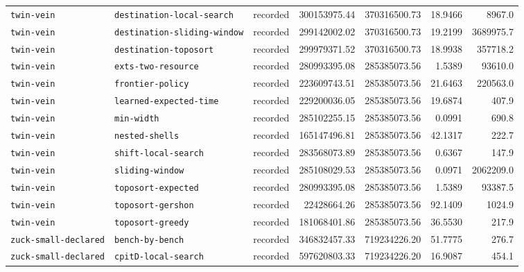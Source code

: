 \begin{longtable}{>{\raggedright\arraybackslash}p{}>{\raggedright\arraybackslash}p{}r r r r r}
\texttt{twin\allowbreak-vein} & \texttt{destination\allowbreak-local\allowbreak-search} & recorded & 300153975.44 & 370316500.73 & 18.9466 & 8967.0 \\
\texttt{twin\allowbreak-vein} & \texttt{destination\allowbreak-sliding\allowbreak-window} & recorded & 299142002.02 & 370316500.73 & 19.2199 & 3689975.7 \\
\texttt{twin\allowbreak-vein} & \texttt{destination\allowbreak-toposort} & recorded & 299979371.52 & 370316500.73 & 18.9938 & 357718.2 \\
\texttt{twin\allowbreak-vein} & \texttt{exts\allowbreak-two\allowbreak-resource} & recorded & 280993395.08 & 285385073.56 & 1.5389 & 93610.0 \\
\texttt{twin\allowbreak-vein} & \texttt{frontier\allowbreak-policy} & recorded & 223609743.51 & 285385073.56 & 21.6463 & 220563.0 \\
\texttt{twin\allowbreak-vein} & \texttt{learned\allowbreak-expected\allowbreak-time} & recorded & 229200036.05 & 285385073.56 & 19.6874 & 407.9 \\
\texttt{twin\allowbreak-vein} & \texttt{min\allowbreak-width} & recorded & 285102255.15 & 285385073.56 & 0.0991 & 690.8 \\
\texttt{twin\allowbreak-vein} & \texttt{nested\allowbreak-shells} & recorded & 165147496.81 & 285385073.56 & 42.1317 & 222.7 \\
\texttt{twin\allowbreak-vein} & \texttt{shift\allowbreak-local\allowbreak-search} & recorded & 283568073.89 & 285385073.56 & 0.6367 & 147.9 \\
\texttt{twin\allowbreak-vein} & \texttt{sliding\allowbreak-window} & recorded & 285108029.53 & 285385073.56 & 0.0971 & 2062209.0 \\
\texttt{twin\allowbreak-vein} & \texttt{toposort\allowbreak-expected} & recorded & 280993395.08 & 285385073.56 & 1.5389 & 93387.5 \\
\texttt{twin\allowbreak-vein} & \texttt{toposort\allowbreak-gershon} & recorded & 22428664.26 & 285385073.56 & 92.1409 & 1024.9 \\
\texttt{twin\allowbreak-vein} & \texttt{toposort\allowbreak-greedy} & recorded & 181068401.86 & 285385073.56 & 36.5530 & 217.9 \\
\texttt{zuck\allowbreak-small\allowbreak-declared} & \texttt{bench\allowbreak-by\allowbreak-bench} & recorded & 346832457.33 & 719234226.20 & 51.7775 & 276.7 \\
\texttt{zuck\allowbreak-small\allowbreak-declared} & \texttt{cpitD\allowbreak-local\allowbreak-search} & recorded & 597620803.33 & 719234226.20 & 16.9087 & 454.1 \\

\end{longtable}
